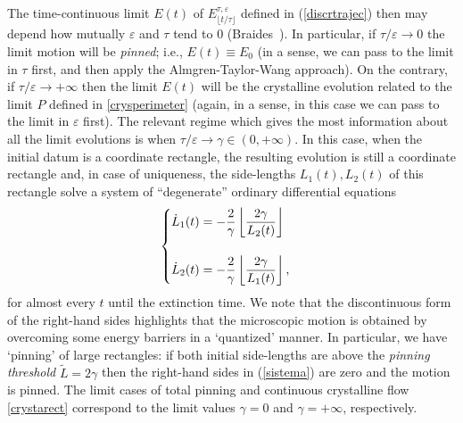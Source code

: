 \documentclass{interact}
\numberwithin{equation}{section}
\theoremstyle{definition}
\renewcommand{\epsilon}{\varepsilon}
\def\e{\epsilon}
\begin{document}
The time-continuous limit $E(t)$ of $E^{\tau,\e}_{\lfloor t/\tau\rfloor}$ defined in (\ref{discrtrajec}) then may depend how mutually $\e$ and $\tau$ tend to $0$ (Braides~\cite[Theorem~8.1]{Bra13}). In particular, if $\tau/\e\to0$ the limit motion will be \emph{pinned}; i.e., $E(t)\equiv E_0$ (in a sense, we can pass to the limit in $\tau$ first, and then apply the Almgren-Taylor-Wang approach). On the contrary, if $\tau/\e\to+\infty$ then the limit $E(t)$ will be 
the crystalline evolution related to the limit $P$ defined in \eqref{crysperimeter} (again, in a sense, in this case we can pass to the limit in $\e$ first). 
The relevant regime which gives the most information about all the limit evolutions is when $\tau/\e\to\gamma\in(0,+\infty)$. In this case, when the initial datum is a coordinate rectangle, the resulting evolution is still a coordinate rectangle and, in case of uniqueness, the side-lengths $L_1(t), L_2(t)$ of this rectangle solve a system of ``degenerate'' ordinary differential equations
\begin{equation}
\begin{cases}\displaystyle \dot L_1(t)= -{2\over \gamma}\left\lfloor{2\gamma\over L_2(t)}\right\rfloor\\ \cr
\displaystyle \dot L_2(t)= -{2\over \gamma}\left\lfloor{2\gamma\over L_1(t)}\right\rfloor,\end{cases}
\label{sistema}
\end{equation}
for almost every $t$ until the extinction time. We note that the discontinuous form of the right-hand sides highlights that the microscopic motion is obtained by overcoming some energy barriers in a `quantized' manner. In particular, we have `pinning' of large rectangles: if both initial side-lengths are above the {\em pinning threshold} $\widetilde L=2\gamma$ then the right-hand sides in (\ref{sistema}) are zero and the motion is pinned. The limit cases of total pinning and continuous crystalline flow \eqref{crystarect} correspond to the limit values $\gamma=0$ and $\gamma=+\infty$, respectively. 
\end{document}

